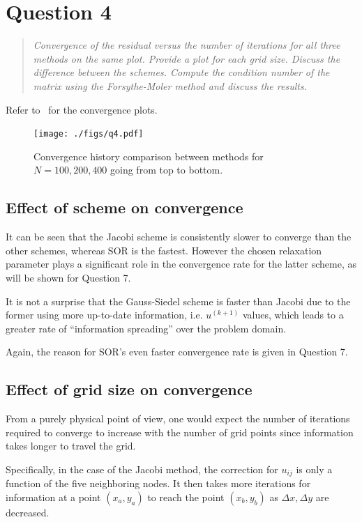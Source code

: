\documentclass{SelimArticle}
\begin{document}
\newpage
\section{Question 4}
\begin{quote}
\textit{
    Convergence of the residual versus the number of iterations for all three
    methods on the same plot. Provide a plot for each grid size. Discuss the
    difference between the schemes.  Compute the condition number of the
    matrix using the Forsythe-Moler method and discuss the results.
}
\end{quote}
Refer to~ for the convergence plots.

\begin{figure}
    \centering
    \texttt{[image: ./figs/q4.pdf]}
    \caption{Convergence history comparison between methods for $N = 100, 200, 400$  going from top to bottom.}\label{fig:q4}
\end{figure}
\subsection{Effect of scheme on convergence}
It can be seen that the Jacobi scheme is consistently slower to converge than the other schemes, whereas
SOR is the fastest. However the chosen relaxation parameter plays a significant role in the convergence rate
for the latter scheme, as will be shown for Question 7.

It is not a surprise that the Gauss-Siedel scheme is faster than Jacobi due to the former using
more up-to-date information, i.e. $u^{(k+1)}$ values, which leads to a greater rate of ``information spreading'' over
the problem domain.

Again, the reason for SOR's even faster convergence rate is given in Question 7.

\subsection{Effect of grid size on convergence}
From a purely physical point of view, one would expect the number of iterations required to converge
to increase with the number of grid points since information takes longer to travel the grid.

Specifically, in the case of the Jacobi method, the correction for $u_{ij}$ is only a function of the five neighboring
nodes. It then takes more iterations for information at a point $(x_a,y_a)$ to reach the point $(x_b, y_b)$ as
$\Delta x, \Delta y$ are decreased.
\end{document}
